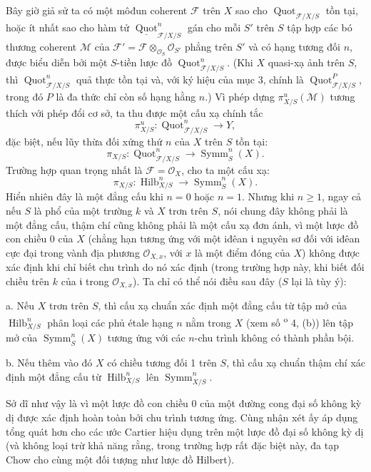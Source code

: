 Bây giờ giả sử ta có một môđun coherent $\mathcal F$ trên $X$ sao cho
$\operatorname{Quot}_{\mathcal F/X/S}$ tồn tại, hoặc ít nhất sao cho hàm tử
$\underline{\operatorname{Quot}}^n_{\mathcal F/X/S}$ gán cho mỗi $S'$ trên
$S$ tập hợp các bó thương coherent $\mathcal M$ của
$\mathcal F'=\mathcal F\otimes_{\mathcal O_S}\mathcal O_{S'}$ phẳng trên
$S'$ và có hạng tương đối $n$, được biểu diễn bởi một $S$-tiền lược đồ
$\operatorname{Quot}^n_{\mathcal F/X/S}$. (Khi $X$ quasi-xạ ảnh trên $S$,
thì $\operatorname{Quot}^n_{\mathcal F/X/S}$ quả thực tồn tại và, với ký hiệu
của mục 3, chính là $\operatorname{Quot}^P_{\mathcal F/X/S}$, trong đó $P$ là
đa thức chỉ còn số hạng hằng $n$.) Vì phép dựng
$\pi^u_{X/S}(\mathcal M)$ tương thích với phép đổi cơ sở, ta thu được một cấu
xạ chính tắc
\[
\pi^u_{X/S}:\operatorname{Quot}^n_{\mathcal F/X/S}\longrightarrow Y,
\]
đặc biệt, nếu lũy thừa đối xứng thứ $n$ của $X$ trên $S$ tồn tại:
\[
\pi_{X/S}:\operatorname{Quot}^n_{\mathcal F/X/S}
\longrightarrow\operatorname{Symm}^n_S(X).
\]
Trường hợp quan trọng nhất là $\mathcal F=\mathcal O_X$, cho ta một cấu xạ:
\[
\pi_{X/S}:\operatorname{Hilb}^n_{X/S}
\longrightarrow\operatorname{Symm}^n_S(X).
\]
Hiển nhiên đây là một đẳng cấu khi $n=0$ hoặc $n=1$. Nhưng khi
$n\geq1$, ngay cả nếu $S$ là phổ của một trường $k$ và $X$ trơn trên
$S$, nói chung đây không phải là một đẳng cấu, thậm chí cũng không phải là một
cấu xạ đơn ánh, vì một lược đồ con chiều 0 của $X$ (chẳng hạn tương ứng với
một iđêan $\mathfrak i$ nguyên sơ đối với iđêan cực đại trong vành địa phương
$\mathcal O_{X,x}$, với $x$ là một điểm đóng của $X$) không được xác định khi
chỉ biết chu trình do nó xác định (trong trường hợp này, khi biết đối chiều
trên $k$ của $\mathfrak i$ trong $\mathcal O_{X,x}$). Ta chỉ có thể nói điều
sau đây ($S$ lại là tùy ý):

\medskip
\noindent a. Nếu $X$ trơn trên $S$, thì cấu xạ chuẩn xác định một đẳng cấu từ
tập mở của $\operatorname{Hilb}^n_{X/S}$ phân loại các phủ étale hạng $n$ nằm
trong $X$ (xem số \textsuperscript{o} 4, (b)) lên tập mở của
$\operatorname{Symm}^n_S(X)$ tương ứng với các $n$-chu trình không có thành
phần bội.

\medskip
\noindent b. Nếu thêm vào đó $X$ có chiều tương đối 1 trên $S$, thì cấu xạ
chuẩn thậm chí xác định một đẳng cấu từ $\operatorname{Hilb}^n_{X/S}$ lên
$\operatorname{Symm}^n_{X/S}$.

Sở dĩ như vậy là vì một lược đồ con chiều 0 của một đường cong đại số không
kỳ dị được xác định hoàn toàn bởi chu trình tương ứng. Cùng nhận xét ấy áp
dụng tổng quát hơn cho các ước Cartier hiệu dụng trên một lược đồ đại số không
kỳ dị (và không loại trừ khả năng rằng, trong trường hợp rất đặc biệt này, đa
tạp Chow cho cùng một đối tượng như lược đồ Hilbert).

